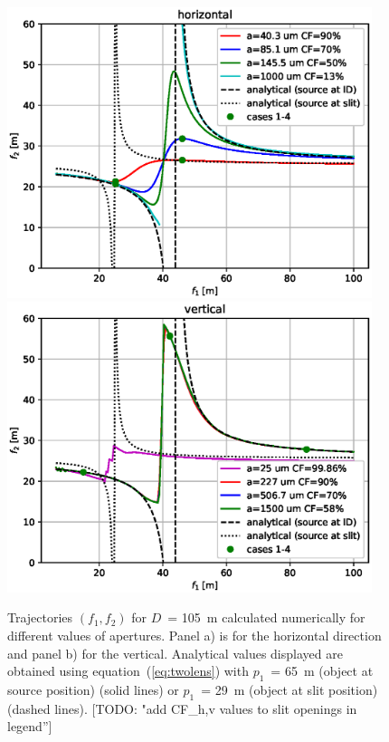 \documentclass{iucr}              %
\newcommand{\todo}[1]{{\color{red}[TODO: "#1'']}}
\begin{document}
\begin{figure}\label{fig:f1f2map}
    \centering

    \includegraphics[width=0.95\textwidth]{figures/f1f2_h.eps}
    \includegraphics[width=0.95\textwidth]{figures/f1f2_v.eps}

    \caption{Trajectories $(f_1,f_2)$ for $D$~= \SI{105}{\meter} calculated numerically for different values of apertures. Panel a) is for the horizontal direction and panel b) for the vertical. 
    Analytical values displayed are obtained using equation~(\ref{eq:twolens}) with $p_1$~= \SI{65}{\meter} (object at source position) (solid lines) or $p_1$~= \SI{29}{\meter} (object at slit position) (dashed lines).
    \todo{add CF\_h,v values to slit openings in legend}
    }
\end{figure}
\end{document}
